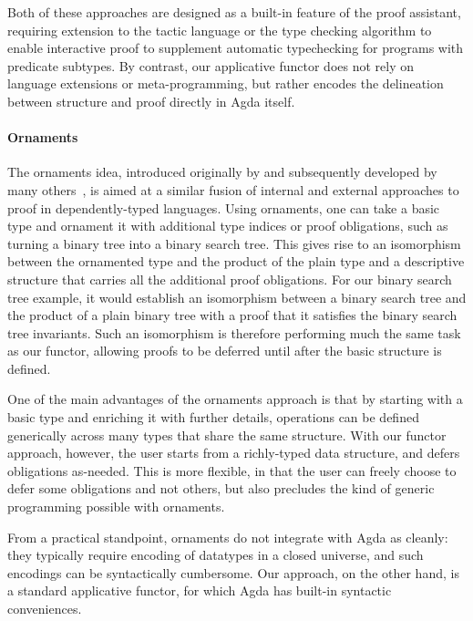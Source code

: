\documentclass[sigplan]{acmart}%
\begin{document}
\noindent Both of these approaches are designed as a built-in feature of 
the proof assistant, requiring extension to the tactic language or 
the type checking algorithm to enable 
interactive proof to supplement automatic typechecking for programs with
 predicate subtypes. By contrast, our applicative functor does not rely on 
 language extensions or meta-programming, but rather encodes the delineation 
 between structure and proof directly in Agda itself.

\paragraph{Ornaments} The ornaments idea, introduced originally by \citet{ornaments1}
and subsequently developed by many others~\citep{ornaments2,ornaments3,ornaments4,ornaments5},
is aimed at a similar fusion of internal and external approaches to proof in 
dependently-typed languages. Using ornaments, one can take a basic type and ornament 
it with additional type indices or proof obligations, such as turning a binary tree 
into a binary search tree. This gives rise to an isomorphism between the ornamented type 
and the product of the plain type and a descriptive structure that carries all the additional 
proof obligations. For our binary search tree example, it would establish an isomorphism 
between a binary search tree and the product of a plain binary tree with a proof that it 
satisfies the binary search tree invariants. Such an isomorphism is therefore 
performing much the same task as our  functor, allowing proofs 
to be deferred until after the basic structure is defined.

One of the main advantages of the ornaments approach is that by starting with a basic type and 
enriching it with further details, operations can be defined generically across many types that 
share the same structure. With our  functor approach, however, the user  
starts from a richly-typed data structure, and defers obligations as-needed. This is more flexible,
in that the user can freely choose to defer some obligations and not others, but also precludes 
the kind of generic programming possible with ornaments.

From a practical standpoint, ornaments do not integrate with Agda as cleanly:  they typically 
require encoding of datatypes in a closed universe, and such encodings can be syntactically
cumbersome. Our approach, on the other hand, is a standard applicative functor, for which Agda 
has built-in syntactic conveniences. 
\end{document}
